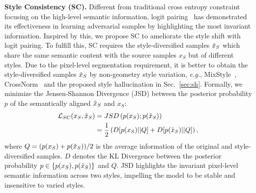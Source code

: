 \documentclass[runningheads]{llncs}
\def\eg{\emph{e.g.}} \def\Eg{\emph{E.g.}}
\begin{document}
\noindent\textbf{Style Consistency (SC).}
Different from traditional cross entropy constraint focusing on the high-level semantic information, logit pairing~\cite{hendrycks2020augmix,kannan2018adversarial} has demonstrated its effectiveness in learning adversarial samples by highlighting the most invariant information.
Inspired by this, we propose SC to ameliorate the style shift with logit pairing.
To fulfill this, SC requires the style-diversified samples $\Tilde{x}_S$ which share the same semantic content with the source samples $x_S$ but of different styles. Due to the pixel-level segmentation requirement, it is better to obtain the style-diversified samples $\Tilde{x}_S$ by non-geometry style variation, \eg, MixStyle~\cite{zhou2021mixstyle}, CrossNorm~\cite{crossnorm} and the proposed style hallucination in Sec.~\ref{sec:sh}.
Formally, we minimize the Jensen-Shannon Divergence (JSD) between the posterior probability $p$ of the semantically aligned $\Tilde{x}_S$ and $x_S$:
\begin{equation}
\begin{aligned}
    \mathcal{L}_{SC} (x_S, \Tilde{x}_S) &= JSD\left(p(x_S); p(\Tilde{x}_S)\right) \\
    &= \frac{1}{2} \left(D [p(x_S) || Q] + D [p(\Tilde{x}_S) || Q] \right), \\
\end{aligned}
\end{equation}
where $Q=(p(x_S) + p(\Tilde{x}_S))/2$ is the average information of the original and style-diversified samples. $D$ denotes the KL Divergence between the posterior probability $p \in \{p(x_S), p(\Tilde{x}_S)\}$ and $Q$. 
JSD highlights the invariant pixel-level semantic information across two styles, impelling the model to be stable and insensitive to varied styles.
\end{document}
